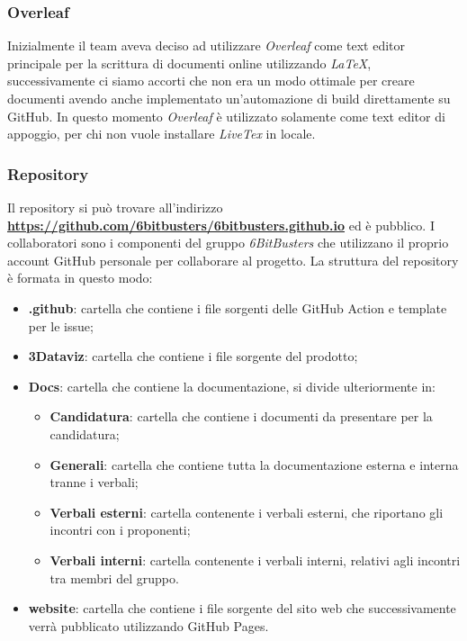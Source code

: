         \subsubsection{Overleaf}
        Inizialmente il team aveva deciso ad utilizzare \textit{Overleaf} come text editor principale per la scrittura di documenti online utilizzando \textit{LaTeX}, successivamente ci siamo accorti
        che non era un modo ottimale per creare documenti avendo anche implementato un'automazione di build direttamente su GitHub.
        In questo momento \textit{Overleaf} è utilizzato solamente come text editor di appoggio, per chi non vuole installare \textit{LiveTex} in locale.
        
        
        \subsubsection{Repository}
        Il repository si può trovare all'indirizzo \textbf{\url{https://github.com/6bitbusters/6bitbusters.github.io}} ed è pubblico.
        I collaboratori sono i componenti del gruppo \textit{6BitBusters} che utilizzano il proprio account GitHub
        personale per collaborare al progetto.
        La struttura del repository è formata in questo modo:
            \begin{itemize}
                \item \textbf{ .github}: cartella che contiene i file sorgenti delle GitHub Action e template per le issue;
                \item \textbf{3Dataviz}: cartella che contiene i file sorgente del prodotto;
                \item \textbf{Docs}: cartella che contiene la documentazione, si divide ulteriormente in:
                    \begin{itemize}
                        \item \textbf{Candidatura}: cartella che contiene i documenti da presentare per la candidatura;
                        \item \textbf{Generali}: cartella che contiene tutta la documentazione esterna e interna tranne i verbali;
                        \item \textbf{Verbali esterni}: cartella contenente i verbali esterni, che riportano gli incontri con i proponenti;
                        \item \textbf{Verbali interni}: cartella contenente i verbali interni, relativi agli incontri tra membri del gruppo.
                    \end{itemize}
                \item \textbf{website}: cartella che contiene i file sorgente del sito web che successivamente verrà pubblicato utilizzando GitHub Pages.
            \end{itemize}
